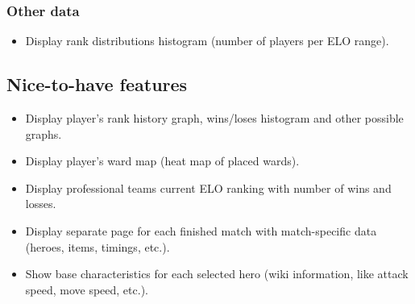 \subsubsection{Other data}

\begin{itemize}

    \item Display rank distributions histogram (number of players per ELO range).

\end{itemize}


\subsection{Nice-to-have features}

\begin{itemize}

    \item Display player's rank history graph, wins/loses histogram and other possible graphs.
    \item Display player's ward map (heat map of placed wards).
    \item Display professional teams current ELO ranking with number of wins and losses.
    \item Display separate page for each finished match with match-specific data (heroes, items, timings, etc.).
    \item Show base characteristics for each selected hero (wiki information, like attack speed, move speed, etc.).

\end{itemize}

